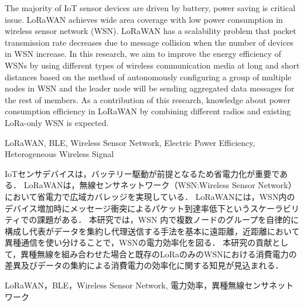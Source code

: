 \begin{eabstract}
    The majority of IoT sensor devices are driven by battery, power saving is critical issue. 
    LoRaWAN achieves wide area coverage with low power consumption in wireless sensor network (WSN). 
    LoRaWAN has a scalability problem that packet transmission rate decreases due to message collision when the number of devices in WSN increase. 
    In this research, we aim to improve the energy efficiency of WSNs by using 
    different types of wireless communication media at long and short distances based on the method of autonomously configuring a group of multiple nodes in WSN and the leader node will be sending aggregated data messages for the rest of members. 
    As a contribution of this research, knowledge about power consumption efficiency in LoRaWAN by combining different radios and existing LoRa-only WSN is expected.
\end{eabstract} 
\begin{ekeyword}
    LoRaWAN, BLE, Wireless Sensor Network, Electric Power Efficiency, Heterogeneous Wireless Signal
\end{ekeyword}

\begin{jabstract}
    IoTセンサデバイスは，バッテリー駆動が前提となるため省電力化が重要である．
    LoRaWANは，無線センサネットワーク（WSN:Wireless Sensor Network）において省電力で広域カバレッジを実現している．
    LoRaWANには，WSN内のデバイス増加時にメッセージ衝突によるパケット到達率低下というスケーラビリティでの課題がある．
    本研究では，WSN 内で複数ノードのグループを自律的に構成し代表がデータを集約し代理送信する手法を基本に遠距離，近距離において異種通信を使い分けることで，WSNの電力効率化を図る．
    本研究の貢献として，異種無線を組み合わせた場合と既存のLoRaのみのWSNにおける消費電力の差異及びデータの集約による消費電力の効率化に関する知見が見込まれる．
\end{jabstract}
\begin{jkeyword}
    LoRaWAN，BLE，Wireless Sensor Network, 電力効率，異種無線センサネットワーク
\end{jkeyword}